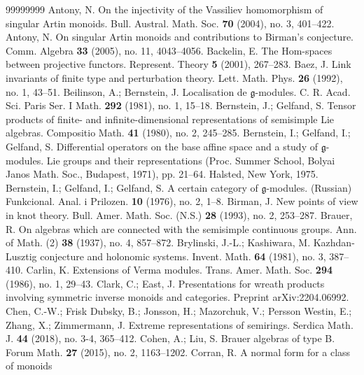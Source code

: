 \documentclass[a4paper]{amsart}
\begin{document}
\begin{thebibliography}{99999999}
 Antony, N. On the injectivity of the Vassiliev 
homomorphism of singular Artin monoids. Bull. Austral. Math. Soc. 
{\bf 70} (2004), no. 3, 401--422.
 Antony, N. On singular Artin monoids and 
contributions to Birman's conjecture. 
Comm. Algebra {\bf 33} (2005), no. 11, 4043--4056.
 Backelin, E. The Hom-spaces between projective 
functors. Represent. Theory {\bf 5} (2001), 267--283.
 Baez, J. Link invariants of finite type and 
perturbation theory. Lett. Math. Phys. {\bf 26} (1992), no. 1, 43--51. 
 Beilinson, A.; Bernstein, J. Localisation de 
$\mathfrak{g}$-modules. C. R. Acad. Sci. Paris Ser. I Math. 
{\bf 292} (1981), no. 1, 15--18.
 Bernstein, J.; Gelfand, S. Tensor products of finite- 
and infinite-dimensional representations of semisimple Lie algebras. 
Compositio Math. {\bf 41} (1980), no. 2, 245--285. 
 Bernstein, I.; Gelfand, I.; Gelfand, S. Differential 
operators on the base affine space and a study of $\mathfrak{g}$-modules. 
Lie groups and their representations (Proc. Summer School, Bolyai Janos 
Math. Soc., Budapest, 1971), pp. 21--64. Halsted, New York, 1975. 
  Bernstein, I.; Gelfand, I.; Gelfand, S. 
A certain category of $\mathfrak{g}$-modules. (Russian) 
Funkcional. Anal. i Prilozen. {\bf 10} (1976), no. 2, 1--8. 
 Birman, J. New points of view in knot theory. 
Bull. Amer. Math. Soc. (N.S.) {\bf 28} (1993), no. 2, 253--287. 
 Brauer, R. On algebras which are connected with 
the semisimple continuous groups. Ann. of Math. (2) {\bf 38} (1937), no. 4, 857--872. 
 Brylinski, J.-L.; Kashiwara, M. Kazhdan-Lusztig conjecture 
and holonomic systems. Invent. Math. {\bf 64} (1981), no. 3, 387--410.
 Carlin, K. Extensions of Verma modules. Trans. 
Amer. Math. Soc. {\bf 294} (1986), no. 1, 29--43.
 Clark, C.; East, J.
Presentations for wreath products involving symmetric inverse
monoids and categories. Preprint arXiv:2204.06992.
 Chen, C.-W.; Frisk Dubsky, B.; Jonsson, H.; 
Mazorchuk, V.; Persson Westin, E.; Zhang, X.; Zimmermann, J. 
Extreme representations of semirings. Serdica Math. J. {\bf 44} 
(2018), no. 3-4, 365--412.
 Cohen, A.; Liu, S. Brauer algebras of type 
B. Forum Math. {\bf 27} (2015), no. 2, 1163--1202.
 Corran, R. A normal form for a class of monoids 

\end{thebibliography}
\end{document}
